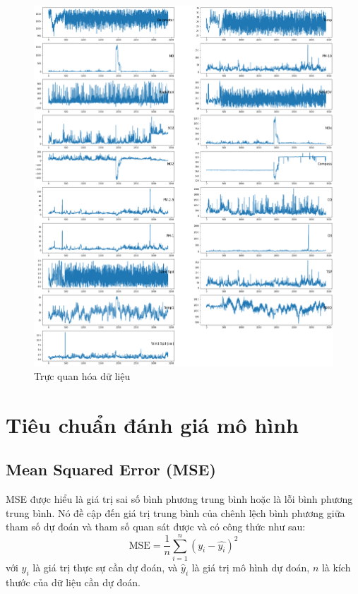 \newpage
\begin{figure}[H]
    \centering
    \includegraphics[width=.99\textwidth]{figures/trucquan.png}
    \caption[Trực quan hóa dữ liệu]{Trực quan hóa dữ liệu}
\end{figure}

\section{Tiêu chuẩn đánh giá mô hình}
\subsection{Mean Squared Error (MSE)}
MSE được hiểu là giá trị sai số bình phương trung bình hoặc là lỗi bình phương trung bình. Nó đề cập đến giá trị trung bình của chênh lệch bình phương giữa tham số dự đoán và tham số quan sát được và có công thức như sau:
\begin{equation}
    \text{MSE} = \frac{1}{n}\sum_{i=1}^n(y_i - \hat{y_i})^2
\end{equation}
với $y_i$ là giá trị thực sự cần dự đoán, và $\hat{y}_i$ là giá trị mô hình dự đoán, $n$ là kích thước của dữ liệu cần dự đoán.


